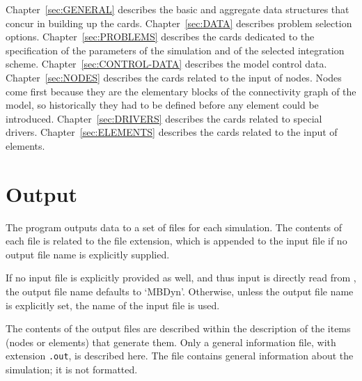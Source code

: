 Chapter~\ref{sec:GENERAL} describes the basic and aggregate
data structures that concur in building up the cards.
Chapter~\ref{sec:DATA} describes problem selection options.
Chapter~\ref{sec:PROBLEMS} describes the cards dedicated
to the specification of the parameters of the simulation
and of the selected integration scheme.
Chapter~\ref{sec:CONTROL-DATA} describes the model control data.
Chapter~\ref{sec:NODES} describes the cards related to the input
of nodes.
Nodes come first because they are the elementary blocks 
of the connectivity graph of the model, so historically 
they had to be defined before any element could be introduced.
Chapter~\ref{sec:DRIVERS} describes the cards related 
to special drivers.
Chapter~\ref{sec:ELEMENTS} describes the cards related to the input
of elements.



\section{Output}
The program outputs data to a set of files for each simulation.
The contents of each file is related to the file extension,
which is appended to the input file if no output file name 
is explicitly supplied.

If no input file is explicitly provided as well, and thus input
is directly read from , the output file name defaults
to `MBDyn'.
Otherwise, unless the output file name is explicitly set, the name 
of the input file is used.

The contents of the output files are described within the description
of the items (nodes or elements) that generate them.
Only a general information file, with extension \texttt{.out}, 
is described here. 
The file contains general information about the simulation; 
it is not formatted. 

